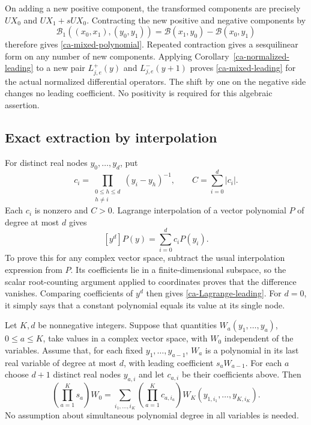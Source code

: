 On adding a new positive component, the transformed components
are precisely $UX_0$ and $UX_1+sUX_0$.
Contracting the new positive and negative components by
\[
 \mathcal B_1((x_0,x_1),(y_0,y_1))
           =\mathcal B(x_1,y_0)-\mathcal B(x_0,y_1)
\]
therefore gives \eqref{ca-mixed-polynomial}.
Repeated contraction gives a sesquilinear form on any number
of new components.
Applying Corollary~\ref{ca-normalized-leading} to a new pair
$L^+_{j,e}(y)$ and $L^-_{j,e}(y+1)$ proves
\eqref{ca-mixed-leading} for the actual normalized differential
operators.  The shift by one on the negative side changes no
leading coefficient.  No positivity is required for this
algebraic assertion.

\subsection{Exact extraction by interpolation}

For distinct real nodes $y_0,\ldots,y_d$, put
\[
 c_i=\prod_{\substack{0\leq h\leq d\\h\ne i}}
                    (y_i-y_h)^{-1},
 \qquad C=\sum_{i=0}^d|c_i|.
\]
Each $c_i$ is nonzero and $C>0$.
Lagrange interpolation of a vector polynomial $P$ of degree
at most $d$ gives
\begin{equation}\label{ca-Lagrange-leading}
 [y^d]P(y)=\sum_{i=0}^d c_i P(y_i).
\end{equation}
To prove this for any complex vector space, subtract the
usual interpolation expression from $P$.  Its coefficients
lie in a finite-dimensional subspace, so the scalar
root-counting argument applied to coordinates proves that
the difference vanishes.  Comparing coefficients of $y^d$
then gives \eqref{ca-Lagrange-leading}.
For $d=0$, it simply says that a constant polynomial equals
its value at its single node.

\begin{proposition}\label{ca-iterated-extraction}
Let $K,d$ be nonnegative integers.  Suppose that quantities
$W_a(y_1,\ldots,y_a)$, $0\leq a\leq K$, take values in a
complex vector space, with $W_0$ independent of the variables.
Assume that, for each fixed $y_1,\ldots,y_{a-1}$,
$W_a$ is a polynomial in its last real variable of degree
at most $d$, with leading coefficient $s_aW_{a-1}$.
For each $a$ choose $d+1$ distinct real nodes $y_{a,i}$ and
let $c_{a,i}$ be their coefficients above.  Then
\begin{equation}\label{ca-extraction}
 \left(\prod_{a=1}^K s_a\right)W_0
  =\sum_{i_1,\ldots,i_K}
       \left(\prod_{a=1}^K c_{a,i_a}\right)
           W_K(y_{1,i_1},\ldots,y_{K,i_K}).
\end{equation}
No assumption about simultaneous polynomial degree in all
variables is needed.
\end{proposition}

